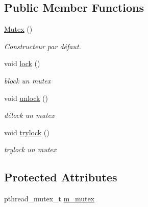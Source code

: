 \subsection*{Public Member Functions}
\begin{DoxyCompactItemize}
\item 
\hypertarget{classmognetwork_1_1_mutex_a281ab0e408b9a388586ee269881d3c26}{\hyperlink{classmognetwork_1_1_mutex_a281ab0e408b9a388586ee269881d3c26}{Mutex} ()}\label{classmognetwork_1_1_mutex_a281ab0e408b9a388586ee269881d3c26}

\begin{DoxyCompactList}\small\item\em Constructeur par défaut. \end{DoxyCompactList}\item 
\hypertarget{classmognetwork_1_1_mutex_a880c4341ad8d63c9bde15f4a60af2848}{void \hyperlink{classmognetwork_1_1_mutex_a880c4341ad8d63c9bde15f4a60af2848}{lock} ()}\label{classmognetwork_1_1_mutex_a880c4341ad8d63c9bde15f4a60af2848}

\begin{DoxyCompactList}\small\item\em block un mutex \end{DoxyCompactList}\item 
\hypertarget{classmognetwork_1_1_mutex_a9f3e0b542f8e9953eca9df6ae408083e}{void \hyperlink{classmognetwork_1_1_mutex_a9f3e0b542f8e9953eca9df6ae408083e}{unlock} ()}\label{classmognetwork_1_1_mutex_a9f3e0b542f8e9953eca9df6ae408083e}

\begin{DoxyCompactList}\small\item\em délock un mutex \end{DoxyCompactList}\item 
\hypertarget{classmognetwork_1_1_mutex_a80d976553316b396cb74cc335fcca31a}{void \hyperlink{classmognetwork_1_1_mutex_a80d976553316b396cb74cc335fcca31a}{trylock} ()}\label{classmognetwork_1_1_mutex_a80d976553316b396cb74cc335fcca31a}

\begin{DoxyCompactList}\small\item\em trylock un mutex \end{DoxyCompactList}\end{DoxyCompactItemize}
\subsection*{Protected Attributes}
\begin{DoxyCompactItemize}
\item 
pthread\-\_\-mutex\-\_\-t \hyperlink{classmognetwork_1_1_mutex_a571d9d0b9b2be3da94192f34b6157ea9}{m\-\_\-mutex}
\end{DoxyCompactItemize}


